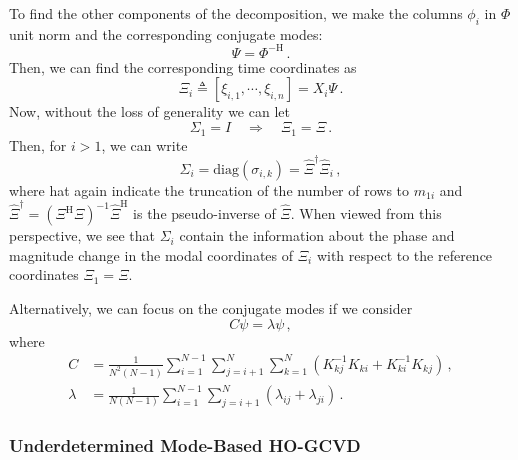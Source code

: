 \documentclass[10pt]{article}
\begin{document}
To find the other components of the decomposition, we make the columns $\phi_i$ in $\Phi$ unit norm and the corresponding conjugate modes:
\begin{equation}
    \Psi = \Phi^{-\mathrm{H}}\,.
\end{equation}
Then, we can find the corresponding time coordinates as
\begin{equation}\label{Meq0}
    \Xi_i\triangleq\left[\xi_{i,1}, \cdots, \xi _{i,n} \right] = X_i \Psi\,.
\end{equation}
Now, without the loss of generality we can let
\begin{equation}
    \Sigma_1 = I \quad \Rightarrow \quad \Xi_1 = \Xi\,.
\end{equation}
Then, for $i>1$, we can write 
\begin{equation}
    \Sigma_i = \mathrm{diag}(\sigma_{i,k})
    = \hat \Xi^\dag \hat \Xi_i\,,
\end{equation}
where hat again indicate the truncation of the number of rows to $m_{1i}$ and $\hat \Xi^\dag = (\Xi^\mathrm{H} \Xi)^{-1}\hat \Xi^\mathrm{H}$ is the pseudo-inverse of $\hat \Xi$.
When viewed from this perspective, we see that $\Sigma_i$ contain the information about the phase and magnitude change in the modal coordinates of $\Xi_i$ with respect to the reference coordinates $\Xi_1=\Xi$.

Alternatively, we can focus on the conjugate modes if we consider
\begin{equation}
     C \psi = \lambda \psi\,,
\end{equation}
where
\begin{equation}
\begin{aligned}
    C & = \frac{1}{N^2(N-1)}\sum_{i=1}^{N-1} \sum_{j=i+1}^N\sum_{k=1}^N \left(K_{kj}^{-1}K_{ki}+K_{ki}^{-1}K_{kj}\right)\,,\\
    \lambda & = \frac{1}{N(N-1)}\sum_{i=1}^{N-1} \sum_{j=i+1}^N \left(\lambda_{ij}+\lambda_{ji}\right)\,.
\end{aligned}    
\end{equation}


\subsubsection{Underdetermined Mode-Based HO-GCVD}
\end{document}
